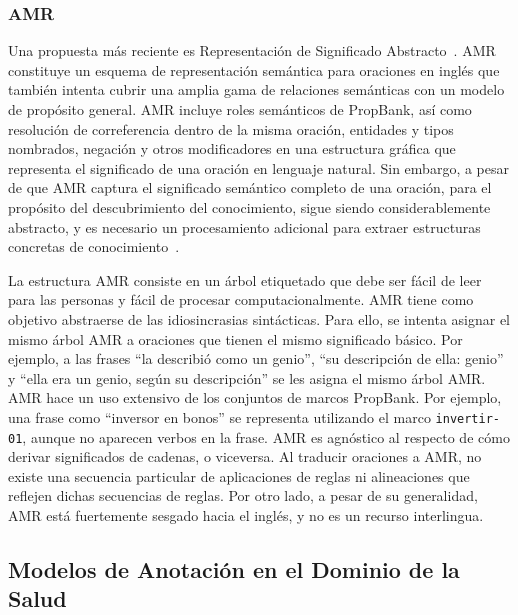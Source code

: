 \subsubsection*{AMR}

Una propuesta más reciente es Representación de Significado Abstracto~\cite[AMR]{amr}.
AMR constituye un esquema de representación semántica para oraciones en inglés que también intenta cubrir una amplia gama de relaciones semánticas con un modelo de propósito general.
AMR incluye roles semánticos de PropBank, así como resolución de correferencia dentro de la misma oración, entidades y tipos nombrados, negación y otros modificadores en una estructura gráfica que representa el significado de una oración en lenguaje natural.
Sin embargo, a pesar de que AMR captura el significado semántico completo de una oración, para el propósito del descubrimiento del conocimiento, sigue siendo considerablemente abstracto, y es necesario un procesamiento adicional para extraer estructuras concretas de conocimiento~\cite{rao2017biomedical}.

La estructura AMR consiste en un árbol etiquetado que debe ser fácil de leer para las personas y fácil de procesar computacionalmente.
AMR tiene como objetivo abstraerse de las idiosincrasias sintácticas.
Para ello, se intenta asignar el mismo árbol AMR a oraciones que tienen el mismo significado básico.
Por ejemplo, a las frases ``la describió como un genio'', ``su descripción de ella: genio'' y ``ella era un genio, según su descripción'' se les asigna el mismo árbol AMR.
AMR hace un uso extensivo de los conjuntos de marcos PropBank.
Por ejemplo, una frase como ``inversor en bonos'' se representa utilizando el marco \texttt{invertir-01}, aunque no aparecen verbos en la frase.
AMR es agnóstico al respecto de cómo derivar significados de cadenas, o viceversa.
Al traducir oraciones a AMR, no existe una secuencia particular de aplicaciones de reglas ni alineaciones que reflejen dichas secuencias de reglas.
Por otro lado, a pesar de su generalidad, AMR está fuertemente sesgado hacia el inglés, y no es un recurso interlingua.

\subsection{Modelos de Anotación en el Dominio de la Salud}\label{sec:health}

